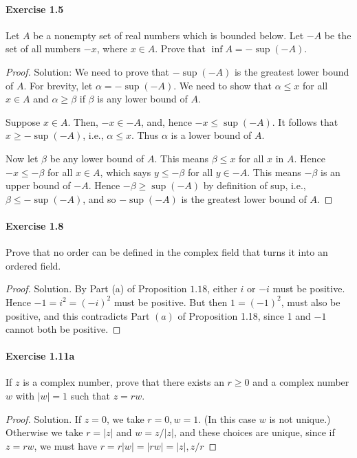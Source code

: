 \documentclass{article}
\theoremstyle{definition}
\begin{document}
\paragraph{Exercise 1.5} Let $A$ be a nonempty set of real numbers which is bounded below. Let $-A$ be the set of all numbers $-x$, where $x \in A$. Prove that $\inf A=-\sup (-A)$.
\begin{proof}
    Solution: We need to prove that $-\sup (-A)$ is the greatest lower bound of $A$. For brevity, let $\alpha=-\sup (-A)$. We need to show that $\alpha \leq x$ for all $x \in A$ and $\alpha \geq \beta$ if $\beta$ is any lower bound of $A$.

Suppose $x \in A$. Then, $-x \in-A$, and, hence $-x \leq \sup (-A)$. It follows that $x \geq-\sup (-A)$, i.e., $\alpha \leq x$. Thus $\alpha$ is a lower bound of $A$.

Now let $\beta$ be any lower bound of $A$. This means $\beta \leq x$ for all $x$ in $A$. Hence $-x \leq-\beta$ for all $x \in A$, which says $y \leq-\beta$ for all $y \in-A$. This means $-\beta$ is an upper bound of $-A$. Hence $-\beta \geq \sup (-A)$ by definition of sup, i.e., $\beta \leq-\sup (-A)$, and so $-\sup (-A)$ is the greatest lower bound of $A$.
\end{proof}


\paragraph{Exercise 1.8} Prove that no order can be defined in the complex field that turns it into an ordered field.
\begin{proof}
    Solution. By Part (a) of Proposition $1.18$, either $i$ or $-i$ must be positive. Hence $-1=i^2=(-i)^2$ must be positive. But then $1=(-1)^2$, must also be positive, and this contradicts Part $(a)$ of Proposition 1.18, since 1 and $-1$ cannot both be positive.
\end{proof}


\paragraph{Exercise 1.11a} If $z$ is a complex number, prove that there exists an $r\geq 0$ and a complex number $w$ with $| w | = 1$ such that $z = rw$.
\begin{proof}
    Solution. If $z=0$, we take $r=0, w=1$. (In this case $w$ is not unique.) Otherwise we take $r=|z|$ and $w=z /|z|$, and these choices are unique, since if $z=r w$, we must have $r=r|w|=|r w|=|z|, z / r$
\end{proof}
\end{document}
